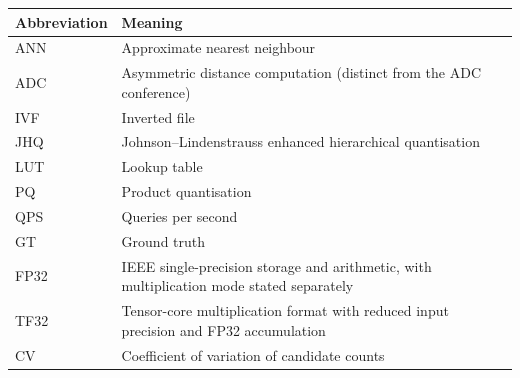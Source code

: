 \bigskip
\begin{longtable}{@{}>{\raggedright\arraybackslash}p{.25\linewidth}>{\raggedright\arraybackslash}p{.70\linewidth}@{}}
\toprule
Abbreviation & Meaning \\
\midrule
ANN & Approximate nearest neighbour \\
ADC & Asymmetric distance computation (distinct from the ADC conference) \\
IVF & Inverted file \\
JHQ & Johnson--Lindenstrauss enhanced hierarchical quantisation \\
LUT & Lookup table \\
PQ & Product quantisation \\
QPS & Queries per second \\
GT & Ground truth \\
FP32 & IEEE single-precision storage and arithmetic, with multiplication mode stated separately \\
TF32 & Tensor-core multiplication format with reduced input precision and FP32 accumulation \\
CV & Coefficient of variation of candidate counts \\
\bottomrule
\end{longtable}
\endgroup
